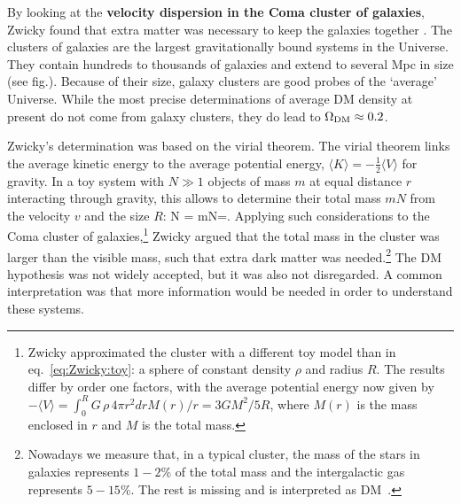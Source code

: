 By looking at the {\bf velocity dispersion in the Coma cluster of galaxies}, Zwicky found that extra matter was necessary to keep the galaxies together \cite{Zwicky:1933gu}. The clusters of galaxies are the largest gravitationally bound systems in the Universe. They contain hundreds to thousands of galaxies and extend to several Mpc in size (see fig.). 
Because of their size, galaxy clusters are good probes of the `average' Universe. 
While the most precise determinations of average DM density at present do not come from galaxy clusters, they do lead to $\Omega_{\rm DM}\approx 0.2$. 

Zwicky's determination was based on the virial theorem. 
The virial theorem links the average kinetic energy to the average potential energy, $\langle K\rangle = -\frac{1}{2}\langle{V}\rangle$ for gravity.
In a toy system with $N\gg 1$ objects of mass $m$
at equal distance $r$ interacting through gravity, this allows to determine their total mass $mN$ from the velocity $v$ and the size $R$:
\beq  
\label{eq:Zwicky:toy}
N  =   
\qquad\Rightarrow\qquad
mN=.
\eeq
Applying such considerations to the Coma cluster of galaxies,\footnote{Zwicky approximated the cluster with a different toy model than in eq.~\eqref{eq:Zwicky:toy}: a sphere of constant density $\rho$ and radius $R$. The results differ by order one factors, with the average potential energy now given by $-\langle{V}\rangle = \int_0^R G \, \rho \, 4\pi r^2 dr M(r)/r = 3 GM^2/5R$, where $M(r)$ is the mass enclosed in $r$ and $M$ is the total mass.} 
Zwicky argued that the total mass in the cluster was larger than the visible mass, such that extra dark matter was needed.\footnote{Nowadays we measure that, in a typical cluster, the mass of the stars in galaxies represents $1-2\%$ of the total mass and the intergalactic gas represents $5-15\%$. The rest is missing and is interpreted as DM~\cite{bulletcluster}.}  The DM hypothesis was not widely accepted, but it was also not disregarded.  A common interpretation was that more information would be needed in order to understand these systems. 

\medskip

